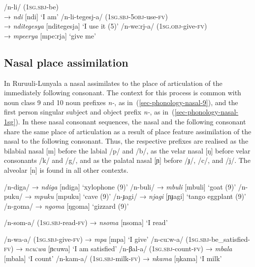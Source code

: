 \ea \label{ex-phonology-fortition}
\begin{xlist}	
	\ex 	/n-li/ (\textsc{1sg.sbj}-be)\\→  \textit{ndi} [ndi] `I am'
	\ex 	/n-li-tegesj-a/ (\textsc{1sg.sbj}-\textsc{5obj}-use-\textsc{fv})\\→  \textit{nditegesya}  [nditegesja]  `I use it (5)' 
	\ex 	/n-weːrj-a/ (\textsc{1sg.obj}-give-\textsc{fv})\\→  \textit{mpeerya} [mpeːrja] `give me'
\end{xlist}	
\z


\subsection{Nasal place assimilation}\label{sec-phonology-nasal-assimilation}

In Ru\-ruu\-li\hyp{}Lu\-nya\-la a nasal assimilates to the place of articulation of the immediately following consonant. 
The context for this process is common with noun class 9 and 10 noun prefixes  \textit{n-}, as in~(\ref{sec-phonology-nasal-9}), and the first person singular subject and object prefix  \textit{n-}, as in~(\ref{sec-phonology-nasal-1sg}). 
In these nasal consonant sequences, the nasal and the following consonant share the same place of articulation as a result of place feature assimilation of the nasal to the following consonant. 
Thus, the respective prefixes are realised as the bilabial nasal [m] before the labial /p/ and /b/, as the velar nasal [ŋ] before velar consonants /k/ and /g/, and as the palatal nasal [ɲ] before /ɟ/, /c/, and /j/. 
The alveolar [n] is found in all other contexts.

\ea \label{sec-phonology-nasal-9}
\begin{xlist}	
\ex /n-diga/ →  \textit{ndiga}  [ndiga] `xylophone (9)'
\ex /n-buli/ →  \textit{mbuli}  [mbuli] `goat (9)'
\ex /n-puku/ →  \textit{mpuku} [mpuku] `cave (9)'
\ex /n-ɟagi/ →  \textit{njagi}  [ɲɟagi] `tango eggplant (9)'
\ex /n-goma/ →  \textit{ngoma}  [ŋgoma] `gizzard (9)'

\end{xlist}	
\z

\ea \label{sec-phonology-nasal-1sg}
\begin{xlist}
\ex /n-som-a/ (\textsc{1sg.sbj}-read-\textsc{fv}) →  \textit{nsoma}  [nsoma] `I read'

\ex /n-wa-a/  (\textsc{1sg.sbj}-give-\textsc{fv}) →  \textit{mpa}  [mpa] `I give'
\ex /n-cuːw-a/  (\textsc{1sg.sbj}-be\_satisfied-\textsc{fv}) →   \textit{ncuːwa}  [ɲcuwa] `I am satisfied'
\ex /n-βal-a/ (\textsc{1sg.sbj}-count-\textsc{fv}) →  \textit{mbala}  [mbala] `I count'
\ex  /n-kam-a/ (\textsc{1sg.sbj}-milk-\textsc{fv}) →  \textit{nkama}  [ŋkama] `I milk'
\end{xlist}	
\z

